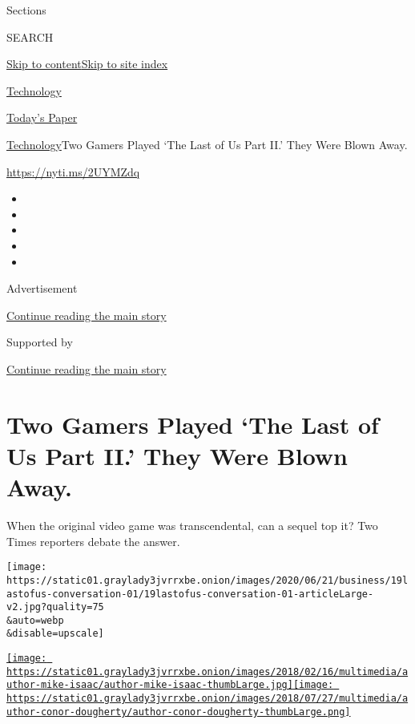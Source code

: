 Sections

SEARCH

\protect\hyperlink{site-content}{Skip to
content}\protect\hyperlink{site-index}{Skip to site index}

\href{https://www.nytimes3xbfgragh.onion/section/technology}{Technology}

\href{https://myaccount.nytimes3xbfgragh.onion/auth/login?response_type=cookie\&client_id=vi}{}

\href{https://www.nytimes3xbfgragh.onion/section/todayspaper}{Today's
Paper}

\href{/section/technology}{Technology}\textbar{}Two Gamers Played `The
Last of Us Part II.' They Were Blown Away.

\href{https://nyti.ms/2UYMZdq}{https://nyti.ms/2UYMZdq}

\begin{itemize}
\item
\item
\item
\item
\item
\end{itemize}

Advertisement

\protect\hyperlink{after-top}{Continue reading the main story}

Supported by

\protect\hyperlink{after-sponsor}{Continue reading the main story}

\hypertarget{two-gamers-played-the-last-of-us-part-ii-they-were-blown-away}{%
\section{Two Gamers Played `The Last of Us Part II.' They Were Blown
Away.}\label{two-gamers-played-the-last-of-us-part-ii-they-were-blown-away}}

When the original video game was transcendental, can a sequel top it?
Two Times reporters debate the answer.

\texttt{[image: https://static01.graylady3jvrrxbe.onion/images/2020/06/21/business/19lastofus-conversation-01/19lastofus-conversation-01-articleLarge-v2.jpg?quality=75\\\&auto=webp\\\&disable=upscale]}

\href{https://www.nytimes3xbfgragh.onion/by/mike-isaac}{\texttt{[image: https://static01.graylady3jvrrxbe.onion/images/2018/02/16/multimedia/author-mike-isaac/author-mike-isaac-thumbLarge.jpg]}}\href{https://www.nytimes3xbfgragh.onion/by/conor-dougherty}{\texttt{[image: https://static01.graylady3jvrrxbe.onion/images/2018/07/27/multimedia/author-conor-dougherty/author-conor-dougherty-thumbLarge.png]}}

